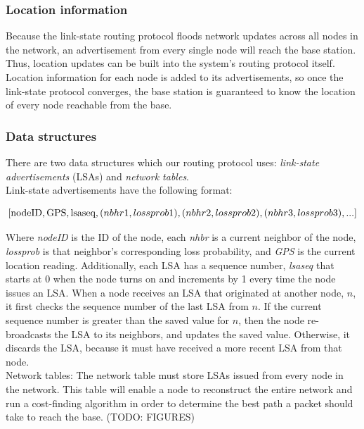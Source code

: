 \documentclass[letterpaper]{article}
\begin{document}
\subsubsection{Location information}

\noindent Because the link-state routing protocol floods network updates across all nodes in the network,
an advertisement from every single node will reach the base station. Thus, location updates can be built 
into the system's routing protocol itself. Location information for each node is added to its 
advertisements, so once the link-state protocol converges, the base station is guaranteed to know the
location of every node reachable from the base.

\subsubsection{Data structures}

\noindent There are two data structures which our routing protocol uses: \emph{link-state advertisements} 
(LSAs) and \emph{network tables}. 
\\

\noindent Link-state advertisements have the following format:

$$ [\textnormal{nodeID}, \textnormal{GPS}, \textnormal{lsaseq}, (nbhr1, lossprob1), 
(nbhr2, lossprob2), (nbhr3, lossprob3), ...] $$

\noindent Where \emph{nodeID} is the ID of the node, each \emph{nhbr} is a current neighbor of the node,
\emph{lossprob} is that neighbor's corresponding loss probability, and \emph{GPS} is the current location
reading. Additionally, each LSA has a sequence number, \emph{lsaseq} that starts at 0 when the node turns on
and increments by 1 every time the node issues an LSA. When a node receives an LSA that originated at another
node, $n$, it first checks the sequence number of the last LSA from $n$. If the current sequence number is 
greater than the saved value for $n$, then the node re-broadcasts the LSA to its neighbors, and updates the 
saved value. Otherwise, it discards the LSA, because it must have received a more recent LSA from that node.
\\

\noindent Network tables: The network table must store LSAs issued from every node in the network. This
table will enable a node to reconstruct the entire network and run a cost-finding algorithm in order to
determine the best path a packet should take to reach the base. (TODO: FIGURES)
\\
\end{document}
